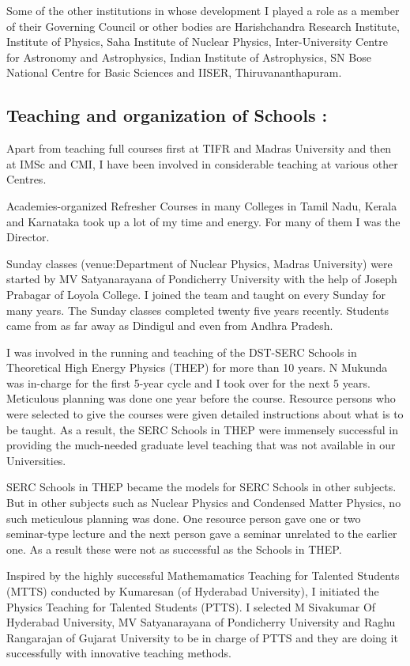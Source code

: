 Some of the other institutions in whose development I played a role as a 
member of their Governing Council or other bodies are Harishchandra 
Research Institute, Institute of Physics, Saha Institute of Nuclear 
Physics, Inter-University Centre for Astronomy and Astrophysics, Indian 
Institute of Astrophysics, SN Bose National Centre for Basic Sciences 
and IISER, Thiruvananthapuram.

\subsection*{Teaching and organization of Schools :}

Apart from teaching full courses first at TIFR and Madras
University and then at IMSc and CMI, I have been involved in
considerable teaching at various other Centres.
\smallskip

Academies-organized Refresher Courses in many Colleges in
Tamil Nadu, Kerala and Karnataka took up a lot of my time and
energy. For many of them I was the Director.
\smallskip

Sunday classes (venue:Department of Nuclear Physics, Madras University) 
were started by MV Satyanarayana of Pondicherry University with the 
help of Joseph Prabagar of Loyola College. I joined the team and taught 
on every Sunday for many years. The Sunday classes completed twenty 
five years recently. Students came from as far away as Dindigul and 
even from Andhra Pradesh.
\smallskip

I was involved in the running and teaching of the DST-SERC
Schools in Theoretical High Energy Physics (THEP) for more
than 10 years. N Mukunda was in-charge for the first 5-year
cycle and I took over for the next 5 years. Meticulous planning
was done one year before the course. Resource persons who were
selected to give the courses were given detailed instructions
about what is to be taught. As a result, the SERC Schools in
THEP were immensely successful in providing the much-needed
graduate level teaching that was not available in our Universities.
\smallskip

SERC Schools in THEP became the models for SERC Schools in other
subjects. But in other subjects such as Nuclear Physics and
Condensed Matter Physics, no such meticulous planning was done.
One resource person gave one or two seminar-type lecture and the
next person gave a seminar unrelated to the earlier one. As a result
these were not as successful as the Schools in THEP.
\smallskip

Inspired by the highly successful Mathemamatics Teaching for Talented 
Students (MTTS) conducted by Kumaresan (of Hyderabad University), I 
initiated the Physics Teaching for Talented Students (PTTS). I selected 
M Sivakumar Of Hyderabad University, MV Satyanarayana of Pondicherry 
University and Raghu Rangarajan of Gujarat University to be in charge 
of PTTS and they are doing it successfully with innovative teaching 
methods.
\smallskip

